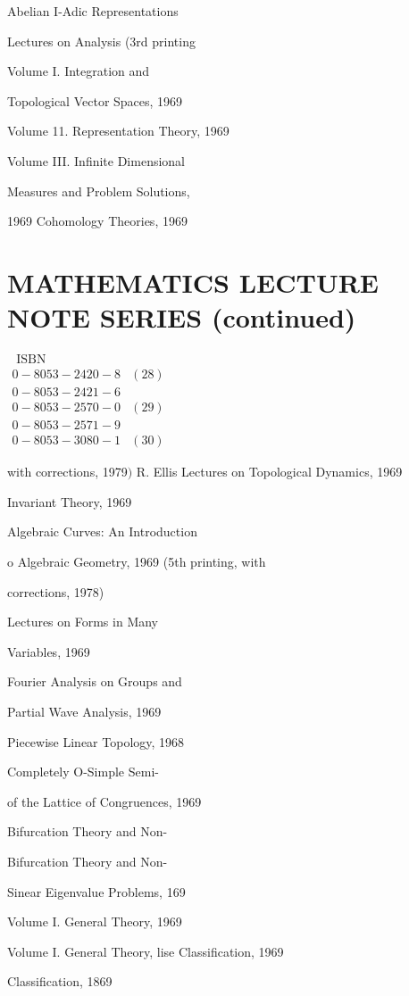 Abelian I-Adic Representations

Lectures on Analysis (3rd printing

Volume I. Integration and

Topological Vector Spaces, 1969

Volume 11. Representation Theory, 1969

Volume III. Infinite Dimensional

Measures and Problem Solutions,

1969 Cohomology Theories, 1969

\section{MATHEMATICS LECTURE NOTE SERIES (continued)}
$\begin{array}{rr}\text { ISBN } & \\ 0-8053-2420-8 & (28) \\ 0-8053-2421-6 & \\ 0-8053-2570-0 & (29) \\ 0-8053-2571-9 & \\ 0-8053-3080-1 & (30)\end{array}$

with corrections, 1979$)$ R. Ellis Lectures on Topological Dynamics, 1969

Invariant Theory, 1969

Algebraic Curves: An Introduction

o Algebraic Geometry, 1969 (5th printing, with

corrections, 1978)

Lectures on Forms in Many

Variables, 1969

Fourier Analysis on Groups and

Partial Wave Analysis, 1969

Piecewise Linear Topology, 1968

Completely O-Simple Semi-

of the Lattice of Congruences, 1969

Bifurcation Theory and Non-

Bifurcation Theory and Non-

Sinear Eigenvalue Problems, 169

Volume I. General Theory, 1969

Volume I. General Theory, lise Classification, 1969

Classification, 1869

